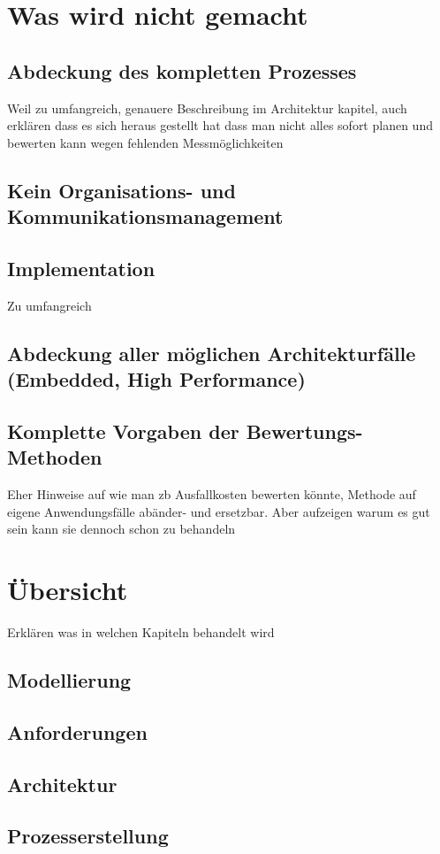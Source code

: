\documentclass[Master,MSE,german]{twbook}
\begin{document}
\section{Was wird nicht gemacht}
\subsection{Abdeckung des kompletten Prozesses}
Weil zu umfangreich, genauere Beschreibung im Architektur kapitel, auch erklären dass es sich heraus gestellt hat dass man nicht alles sofort planen und bewerten kann wegen fehlenden Messmöglichkeiten
\subsection{Kein Organisations- und Kommunikationsmanagement}
\subsection{Implementation}
Zu umfangreich
\subsection{Abdeckung aller möglichen Architekturfälle (Embedded, High Performance)}
\subsection{Komplette Vorgaben der Bewertungs-Methoden}
Eher Hinweise auf wie man zb Ausfallkosten bewerten könnte, Methode auf eigene Anwendungsfälle abänder- und ersetzbar. Aber aufzeigen warum es gut sein kann sie dennoch schon zu behandeln

\section{Übersicht}
Erklären was in welchen Kapiteln behandelt wird
\subsection{Modellierung}
\subsection{Anforderungen}
\subsection{Architektur}
\subsection{Prozesserstellung}
\end{document}
